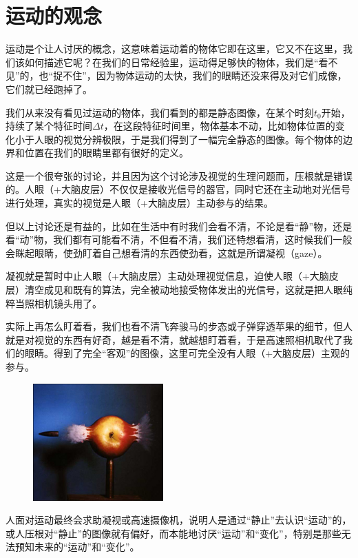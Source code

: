 \section{运动的观念}

运动是个让人讨厌的概念，这意味着运动着的物体它即在这里，它又不在这里，我们该如何描述它呢？在我们的日常经验里，运动得足够快的物体，我们是“看不见”的，也“捉不住”，因为物体运动的太快，我们的眼睛还没来得及对它们成像，它们就已经跑掉了。

我们从来没有看见过运动的物体，我们看到的都是静态图像，在某个时刻$t_0$开始，持续了某个特征时间$\Delta t$，在这段特征时间里，物体基本不动，比如物体位置的变化小于人眼的视觉分辨极限，于是我们得到了一幅完全静态的图像。每个物体的边界和位置在我们的眼睛里都有很好的定义。

这是一个很夸张的讨论，并且因为这个讨论涉及视觉的生理问题而，压根就是错误的。人眼（+大脑皮层）不仅仅是接收光信号的器官，同时它还在主动地对光信号进行处理，真实的视觉是人眼（+大脑皮层）主动参与的结果。

但以上讨论还是有益的，比如在生活中有时我们会看不清，不论是看“静”物，还是看“动”物，我们都有可能看不清，不但看不清，我们还特想看清，这时候我们一般会眯起眼睛，使劲盯着自己想看清的东西使劲看，这就是所谓凝视（gaze）。

凝视就是暂时中止人眼（+大脑皮层）主动处理视觉信息，迫使人眼（+大脑皮层）清空成见和既有的算法，完全被动地接受物体发出的光信号，这就是把人眼纯粹当照相机镜头用了。

实际上再怎么盯着看，我们也看不清飞奔骏马的步态或子弹穿透苹果的细节，但人就是对视觉的东西有好奇，越是看不清，就越想盯着看，于是高速照相机取代了我们的眼睛。得到了完全“客观”的图像，这里可完全没有人眼（+大脑皮层）主观的参与。

\begin{figure}[htbp]
\begin{center}
\includegraphics[width=5cm]{Preface/shootapple.jpg}
\end{center}
\end{figure}

人面对运动最终会求助凝视或高速摄像机，说明人是通过“静止”去认识“运动”的，或人压根对“静止”的图像就有偏好，而本能地讨厌“运动”和“变化”，特别是那些无法预知未来的“运动”和“变化”。

